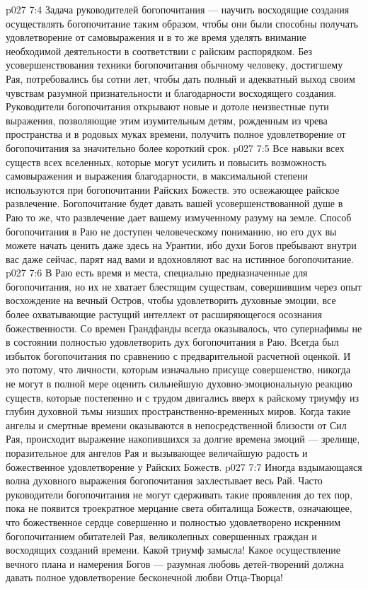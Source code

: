 \vs p027 7:4 \pc Задача руководителей богопочитания --- научить восходящие создания осуществлять богопочитание таким образом, чтобы они были способны получать удовлетворение от самовыражения и в то же время уделять внимание необходимой деятельности в соответствии с райским распорядком. Без усовершенствования техники богопочитания обычному человеку, достигшему Рая, потребовались бы сотни лет, чтобы дать полный и адекватный выход своим чувствам разумной признательности и благодарности восходящего создания. Руководители богопочитания открывают новые и дотоле неизвестные пути выражения, позволяющие этим изумительным детям, рожденным из чрева пространства и в родовых муках времени, получить полное удовлетворение от богопочитания за значительно более короткий срок.
\vs p027 7:5 Все навыки всех существ всех вселенных, которые могут усилить и повысить возможность самовыражения и выражения благодарности, в максимальной степени используются при богопочитании Райских Божеств.   это освежающее райское развлечение. Богопочитание будет давать вашей усовершенствованной душе в Раю то же, что развлечение дает вашему измученному разуму на земле. Способ богопочитания в Раю не доступен человеческому пониманию, но его дух вы можете начать ценить даже здесь на Урантии, ибо духи Богов пребывают внутри вас даже сейчас, парят над вами и вдохновляют вас на истинное богопочитание.
\vs p027 7:6 В Раю есть время и места, специально предназначенные для богопочитания, но их не хватает блестящим существам, совершившим через опыт восхождение на вечный Остров, чтобы удовлетворить духовные эмоции, все более охватывающие растущий интеллект от расширяющегося осознания божественности. Со времен Грандфанды всегда оказывалось, что супернафимы не в состоянии полностью удовлетворить дух богопочитания в Раю. Всегда был избыток богопочитания по сравнению с предварительной расчетной оценкой. И это потому, что личности, которым изначально присуще совершенство, никогда не могут в полной мере оценить сильнейшую духовно\hyp{}эмоциональную реакцию существ, которые постепенно и с трудом двигались вверх к райскому триумфу из глубин духовной тьмы низших пространственно\hyp{}временных миров. Когда такие ангелы и смертные времени оказываются в непосредственной близости от Сил Рая, происходит выражение накопившихся за долгие времена эмоций --- зрелище, поразительное для ангелов Рая и вызывающее величайшую радость и божественное удовлетворение у Райских Божеств.
\vs p027 7:7 Иногда вздымающаяся волна духовного выражения богопочитания захлестывает весь Рай. Часто руководители богопочитания не могут сдерживать такие проявления до тех пор, пока не появится троекратное мерцание света обиталища Божеств, означающее, что божественное сердце совершенно и полностью удовлетворено искренним богопочитанием обитателей Рая, великолепных совершенных граждан и восходящих созданий времени. Какой триумф замысла! Какое осуществление вечного плана и намерения Богов --- разумная любовь детей\hyp{}творений должна давать полное удовлетворение бесконечной любви Отца\hyp{}Творца!
